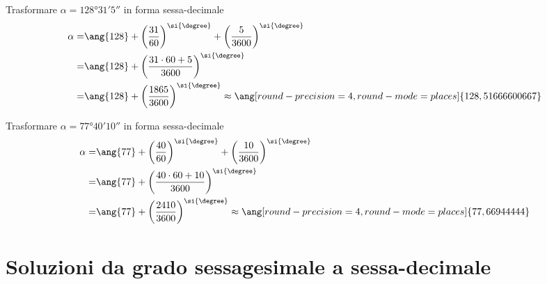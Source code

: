   \begin{exercise}
  	Trasformare  $\alpha=\ang{128;31;5}$ in forma sessa-decimale
  	\tcblower
  	\begin{align*}
  	\alpha=&\ang{128}+\left(\dfrac{31}{60}\right)^{\si{\degree} }+\left(\dfrac{5}{3600}\right)^{\si{\degree} }\\
  	=&\ang{128}+\left(\dfrac{31\cdot60+5}{3600}\right)^{\si{\degree}}\\
  	=&\ang{128}+\left(\dfrac{1865}{3600}\right)^{\si{\degree}}\approx\ang[round-precision=\lungarrotandamento,round-mode=places]{128,51666600667}
  	\end{align*}
  \end{exercise}
  \begin{exercise}
  	Trasformare  $\alpha=\ang{77;40;10}$ in forma sessa-decimale
  	\tcblower
  	\begin{align*}
  	\alpha=&\ang{77}+\left(\dfrac{40}{60}\right)^{\si{\degree} }+\left(\dfrac{10}{3600}\right)^{\si{\degree} }\\
  	=&\ang{77}+\left(\dfrac{40\cdot60+10}{3600}\right)^{\si{\degree}}\\
  	=&\ang{77}+\left(\dfrac{2410}{3600}\right)^{\si{\degree}}\approx\ang[round-precision=\lungarrotandamento,round-mode=places]{77,66944444}
  	\end{align*}
  \end{exercise}
\tcbstoprecording
\newpage
\section{Soluzioni da grado sessagesimale a sessa-decimale}
\tcbinputrecords
